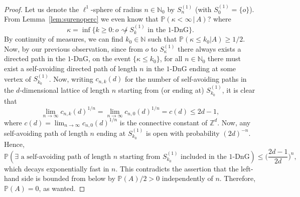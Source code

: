 \documentclass{article}
\newcommand{\N}{\mathbb{N}}
\theoremstyle{definition}
\renewcommand{\P}{\mathbb{P}}
\newcommand{\1}{\mathbbm{1}}
\newcommand{\0}{\mathbf{o}}
\newcommand{\Z}{\mathbb{Z}}
\begin{document}
\begin{proof}
Let us denote the $\ell^1$-sphere of radius $n\in\N_0$ by $S^{(1)}_n$ (with $S^{(1)}_0=\{o\}$). From Lemma~\ref{lem:surenoperc} we even know that $\P(\kappa<\infty\,|\,A)$? where
\[ \kappa = \inf \big\{ k \geq 0 \colon o \not\rightsquigarrow S^{(1)}_k \text{ in the $1$-DnG} \big\}. \]
By continuity of measures, we can find $k_0\in\N$ such that $\P(\kappa \leq k_0 |A) \geq 1/2$. Now, by our previous observation, since from $o$ to $S^{(1)}_\kappa$ there always exists a directed path in the $1$-DnG, 
on the event $\{ \kappa \leq k_0 \}$, for all $n\in\N_0$ there must exist a self-avoiding directed path of length $n$ in the $1$-DnG ending at some vertex of $S^{(1)}_{k_0}$. Now, writing $c_{n,k}(d)$ for the number of self-avoiding paths in the $d$-dimensional lattice of length $n$ starting from (or ending at) $S^{(1)}_{k_0}$, it is clear that
\[ \lim_{n\to\infty} c_{n,k}(d)^{1/n} = \lim_{n\to\infty} c_{n,0}(d)^{1/n}=c(d) \leq 2d-1, \]
where $c(d)=\lim_{n\to\infty} c_{n,0}(d)^{1/n}$ is the connective constant of $\Z^d$. Now, any self-avoiding path of length $n$ ending at $S^{(1)}_{k_0}$ is open with probability $(2d)^{-n}$. Hence,
\[ \P(\exists\text{ a self-avoiding path of length $n$ starting from $S^{(1)}_{k_0}$ included in the $1$-DnG}) \leq \Big( \frac{2d-1}{2d} \Big)^n, \]
which decays exponentially fast in $n$. This contradicts the assertion that the left-hand side is bounded from below by $\P(A)/2>0$ independently of $n$. Therefore, $\P(A)=0$, as wanted.
\end{proof}
\end{document}
